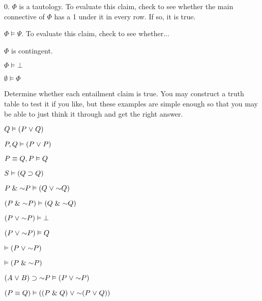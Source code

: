\begin{earg}
		\item[0.] $\Phi$ is a tautology.
		To evaluate this claim, check to see whether the main connective of $\Phi$ has a 1 under it in every row. If so, it is true.
		\item $\Phi \models \Psi$. 
		To evaluate this claim, check to see whether... 
		
		\item $\Phi$ is contingent.
\item $\Phi \models \bot$
		\item $\emptyset \models \Phi$
	\end{earg}


\problempart
Determine whether each entailment claim is true. You may construct a truth table to test it if you like, but these examples are simple enough so that you may be able to just think it through and get the right answer.
\begin{earg}
\item $Q \vDash (P \mkern1mu\vee\mkern1mu Q)$
\item $P, Q \vDash (P \mkern1mu\vee\mkern1mu P)$
\item $P \equiv Q, P \vDash Q$ %
\item $S \vDash (Q \supset Q)$   %
\item $P \eand \enot P \models (Q \eor \enot Q)$%
\item $(P \eand \enot P) \models (Q \eand \enot Q)$
\item $(P \eor \enot P) \models \bot$
\item $(P \eor \enot P) \models Q$%
\item $\models (P \eor \enot P)$
\item $\models (P \eand \enot P)$
\item $(A \eor B) \eif \enot P \models (P \eor \enot P)$
\item $(P \eiff Q) \models ((P \eand Q) \eor \enot (P \eor Q))$
\end{earg}

\fi 
